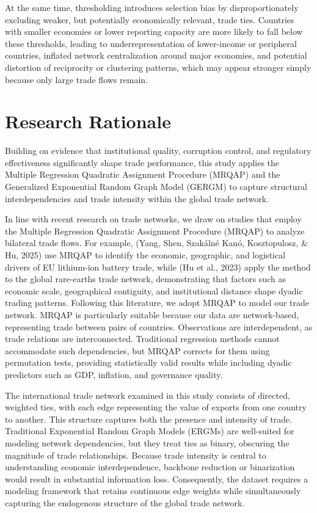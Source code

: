 \documentclass[
]{article}
\begin{document}
At the same time, thresholding introduces selection bias by
disproportionately excluding weaker, but potentially economically
relevant, trade ties. Countries with smaller economies or lower
reporting capacity are more likely to fall below these thresholds,
leading to underrepresentation of lower-income or peripheral countries,
inflated network centralization around major economies, and potential
distortion of reciprocity or clustering patterns, which may appear
stronger simply because only large trade flows remain.

\section{Research Rationale}\label{research-rationale}

Building on evidence that institutional quality, corruption control, and
regulatory effectiveness significantly shape trade performance, this
study applies the Multiple Regression Quadratic Assignment Procedure
(MRQAP) and the Generalized Exponential Random Graph Model (GERGM) to
capture structural interdependencies and trade intensity within the
global trade network.

In line with recent research on trade networks, we draw on studies that
employ the Multiple Regression Quadratic Assignment Procedure (MRQAP) to
analyze bilateral trade flows. For example, (Yang, Shen, Szakálné Kanó,
Kosztopulosz, \& Hu, 2025) use MRQAP to identify the economic,
geographic, and logistical drivers of EU lithium-ion battery trade,
while (Hu et al., 2023) apply the method to the global rare-earths trade
network, demonstrating that factors such as economic scale, geographical
contiguity, and institutional distance shape dyadic trading patterns.
Following this literature, we adopt MRQAP to model our trade network.
MRQAP is particularly suitable because our data are network-based,
representing trade between pairs of countries. Observations are
interdependent, as trade relations are interconnected. Traditional
regression methods cannot accommodate such dependencies, but MRQAP
corrects for them using permutation tests, providing statistically valid
results while including dyadic predictors such as GDP, inflation, and
governance quality.

The international trade network examined in this study consists of
directed, weighted ties, with each edge representing the value of
exports from one country to another. This structure captures both the
presence and intensity of trade. Traditional Exponential Random Graph
Models (ERGMs) are well-suited for modeling network dependencies, but
they treat ties as binary, obscuring the magnitude of trade
relationships. Because trade intensity is central to understanding
economic interdependence, backbone reduction or binarization would
result in substantial information loss. Consequently, the dataset
requires a modeling framework that retains continuous edge weights while
simultaneously capturing the endogenous structure of the global trade
network.
\end{document}

